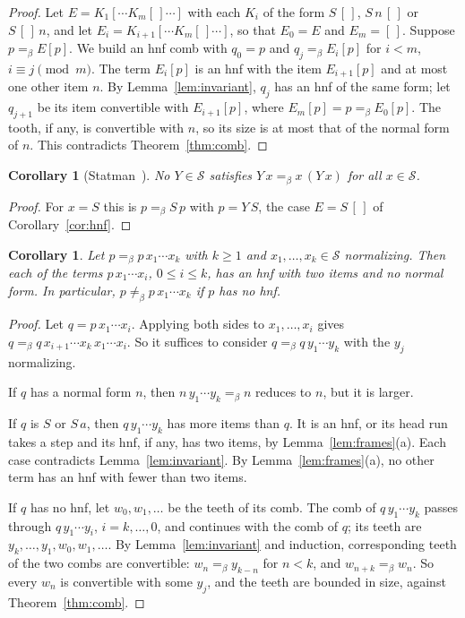 \documentclass[11pt]{amsart}
\newtheorem{corollary}[theorem]{Corollary}
\theoremstyle{definition}
\newcommand{\Ter}{\mathcal S}
\newcommand{\conv}{=_\beta}
\begin{document}
\begin{proof}
Let $E=K_1[\cdots K_m[\,]\cdots]$ with each $K_i$ of the form $S\,[\,]$, $S\,n\,[\,]$ or
$S\,[\,]\,n$, and let $E_i=K_{i+1}[\cdots K_m[\,]\cdots]$, so that $E_0=E$ and $E_m=[\,]$. Suppose
$p\conv E[p]$. We build an hnf comb with $q_0=p$ and $q_j\conv E_i[p]$ for $i<m$, $i\equiv j\pmod m$.
The term $E_i[p]$ is an hnf with the item $E_{i+1}[p]$ and at most one other item $n$. By
Lemma~\ref{lem:invariant}, $q_j$ has an hnf of the same form; let $q_{j+1}$ be its item
convertible with $E_{i+1}[p]$, where $E_m[p]=p\conv E_0[p]$. The tooth, if any, is convertible with
$n$, so its size is at most that of the normal form of $n$. This contradicts
Theorem~\ref{thm:comb}.
\end{proof}

\begin{corollary}[{Statman~\citep[Rem.~15]{dots}}]\label{cor:fpc}
No $Y\in\Ter$ satisfies $Y\,x\conv x\,(Y\,x)$ for all $x\in\Ter$.
\end{corollary}

\begin{proof}
For $x=S$ this is $p\conv S\,p$ with $p=Y\,S$, the case $E=S\,[\,]$ of Corollary~\ref{cor:hnf}.
\end{proof}

\begin{corollary}\label{cor:left}
Let $p\conv p\,x_1\cdots x_k$ with $k\ge1$ and $x_1,\dots,x_k\in\Ter$ normalizing. Then each of the
terms $p\,x_1\cdots x_i$, $0\le i\le k$, has an hnf with two items and no normal form. In particular,
$p\not\conv p\,x_1\cdots x_k$ if $p$ has no hnf.
\end{corollary}

\begin{proof}
Let $q=p\,x_1\cdots x_i$. Applying both sides to $x_1,\dots,x_i$ gives
$q\conv q\,x_{i+1}\cdots x_k\,x_1\cdots x_i$. So it suffices to consider $q\conv q\,y_1\cdots y_k$
with the $y_j$ normalizing.

If $q$ has a normal form $n$, then $n\,y_1\cdots y_k\conv n$ reduces to $n$, but it is larger.

If $q$ is $S$ or $S\,a$, then $q\,y_1\cdots y_k$ has more items than $q$. It is an hnf, or its head run takes a step and
its hnf, if any, has two items, by Lemma~\ref{lem:frames}(a). Each case contradicts Lemma~\ref{lem:invariant}. By
Lemma~\ref{lem:frames}(a), no other term has an hnf with fewer than two items.

If $q$ has no hnf, let $w_0,w_1,\dots$ be the teeth of its comb. The comb of $q\,y_1\cdots y_k$ passes
through $q\,y_1\cdots y_i$, $i=k,\dots,0$, and continues with the comb of $q$; its teeth are
$y_k,\dots,y_1,w_0,w_1,\dots$. By Lemma~\ref{lem:invariant} and induction, corresponding teeth of the
two combs are convertible: $w_n\conv y_{k-n}$ for $n<k$, and $w_{n+k}\conv w_n$. So every $w_n$ is
convertible with some $y_j$, and the teeth are bounded in size, against Theorem~\ref{thm:comb}.
\end{proof}
\end{document}
